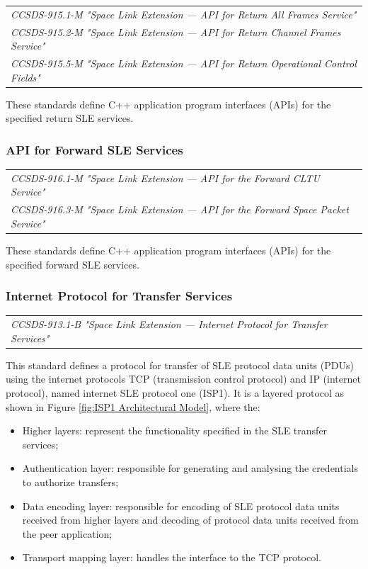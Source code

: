 \begin{tabular}{l}
\textit{CCSDS-915.1-M "Space Link Extension — API for Return All Frames Service" \cite{CCSDS-915.1-M}} \\
\textit{CCSDS-915.2-M "Space Link Extension — API for Return Channel Frames Service" \cite{CCSDS-915.2-M}} \\
\textit{CCSDS-915.5-M "Space Link Extension — API for Return Operational Control Fields" \cite{CCSDS-915.5-M}} \\
\end{tabular}

These standards define C++ application program interfaces (APIs) for the specified return SLE services.

\subsubsection{API for Forward SLE Services}

\begin{tabular}{l}
\textit{CCSDS-916.1-M "Space Link Extension — API for the Forward CLTU Service" \cite{CCSDS-916.1-M}} \\
\textit{CCSDS-916.3-M "Space Link Extension — API for the Forward Space Packet Service" \cite{CCSDS-916.3-M}} \\
\end{tabular}

These standards define C++ application program interfaces (APIs) for the specified forward SLE services.

\subsubsection{Internet Protocol for Transfer Services}

\begin{tabular}{l}
\textit{CCSDS-913.1-B "Space Link Extension — Internet Protocol for Transfer Services" \cite{CCSDS-913.1-B}} \\
\end{tabular}

This standard defines a protocol for transfer of SLE protocol data units (PDUs) using the internet protocols TCP (transmission control protocol) and IP (internet protocol), named internet SLE protocol one (ISP1). It is a layered protocol as shown in Figure \ref{fig:ISP1 Architectural Model}, where the:

\begin{itemize}
\item Higher layers: represent the functionality specified in the SLE transfer services;
\item Authentication layer: responsible for generating and analysing the credentials to authorize transfers;
\item Data encoding layer: responsible for encoding of SLE protocol data units received from higher layers and decoding of protocol data units received from the peer application;
\item Transport mapping layer: handles the interface to the TCP protocol.
\end{itemize}

